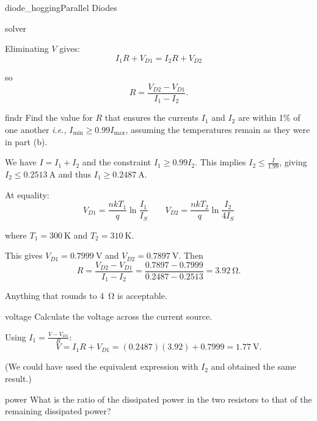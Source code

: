 \begin{mainquestion}{diode_hogging}{Parallel Diodes}
\begin{partquestion}{solver}
\begin{answer}
Eliminating $V$ gives:
\[
I_1 R + V_{D1} = I_2 R + V_{D2}
\]

so
\[
R = \frac{V_{D2} - V_{D1}}{I_1 - I_2}.
\]
\end{answer}
\end{partquestion}

\begin{partquestion}{findr}
{Find the value for $R$ that ensures the currents $I_1$ and $I_2$ are within 1\% of one another \textit{i.e.,} $I_{\mathrm{min}} \geq 0.99I_{\mathrm{max}}$, assuming the temperatures remain as they were in part (b).}

\begin{answer}
We have $I = I_1 + I_2$ and the constraint $I_1 \ge 0.99 I_2$. This implies $I_2 \le \frac{I}{1.99}$, giving $I_2 \le \qty{0.2513}{\ampere}$ and thus $I_1 \ge \qty{0.2487}{\ampere}$.

At equality:
\[
V_{D1} = \frac{nkT_1}{q}\ln\!\frac{I_1}{I_S}
\qquad
V_{D2} = \frac{nkT_2}{q}\ln\!\frac{I_2}{4I_S}
\]

where $T_1 = \qty{300}{\kelvin}$ and $T_2 = \qty{310}{\kelvin}$.

This gives $V_{D1} = \qty{0.7999}{\volt}$ and $V_{D2} = \qty{0.7897}{\volt}$. Then
\[
R = \frac{V_{D2} - V_{D1}}{I_1 - I_2}
=
\frac{0.7897 - 0.7999}{0.2487 - 0.2513}
=
\qty{3.92}{\ohm}.
\]

Anything that rounds to \qty{4}{\ohm} is acceptable.
\end{answer}
\end{partquestion}

\begin{partquestion}{voltage}
{Calculate the voltage across the current source.}

\begin{answer}
Using $I_1 = \frac{V - V_{D1}}{R}$:
\[
V = I_1 R + V_{D1}
= (0.2487)(3.92) + 0.7999
= \qty{1.77}{\volt}.
\]

(We could have used the equivalent expression with $I_2$ and obtained the same result.)
\end{answer}
\end{partquestion}

\begin{partquestion}{power}
{What is the ratio of the dissipated power in the two resistors to that of the remaining dissipated power?}


\end{partquestion}
\end{mainquestion}
